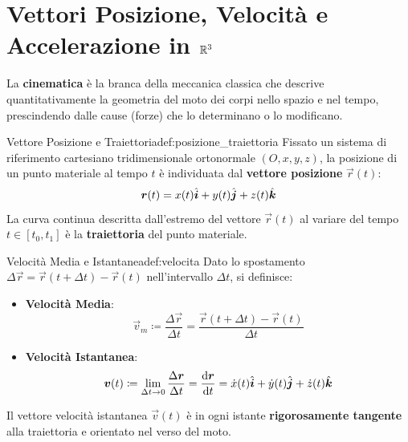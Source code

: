 \vspace{0.5em}

\section{Vettori Posizione, Velocità e Accelerazione in $\mathbb{R}^3$}
\label{sec:vettori_cinematici}

La \textbf{cinematica} è la branca della meccanica classica che descrive quantitativamente la geometria del moto dei corpi nello spazio e nel tempo, prescindendo dalle cause (forze) che lo determinano o lo modificano.

\begin{definizione}{Vettore Posizione e Traiettoria}{def:posizione_traiettoria}
Fissato un sistema di riferimento cartesiano tridimensionale ortonormale $(O, x, y, z)$, la posizione di un punto materiale al tempo $t$ è individuata dal \textbf{vettore posizione} $\vec{r}(t)$:
\begin{equation}
    \bm{r}(t) = x(t)\hat{\bm{i}} + y(t)\hat{\bm{j}} + z(t)\hat{\bm{k}}
    \label{eq:vettore_posizione}
\end{equation}
La curva continua descritta dall'estremo del vettore $\vec{r}(t)$ al variare del tempo $t \in [t_0, t_1]$ è la \textbf{traiettoria} del punto materiale.
\end{definizione}

\begin{definizione}{Velocità Media e Istantanea}{def:velocita}
Dato lo spostamento $\Delta\vec{r} = \vec{r}(t+\Delta t) - \vec{r}(t)$ nell'intervallo $\Delta t$, si definisce:
\begin{itemize}
    \item \textbf{Velocità Media}:
    \begin{equation}
        \vec{v}_m \coloneqq \frac{\Delta\vec{r}}{\Delta t} = \frac{\vec{r}(t+\Delta t) - \vec{r}(t)}{\Delta t}
    \end{equation}
    \item \textbf{Velocità Istantanea}:
    \begin{equation}
        \bm{v}(t) \coloneqq \lim_{\Delta t \to 0} \frac{\Delta\bm{r}}{\Delta t} = \frac{\mathrm{d} \bm{r}}{\mathrm{d} t} = \dot{x}(t)\hat{\bm{i}} + \dot{y}(t)\hat{\bm{j}} + \dot{z}(t)\hat{\bm{k}}
        \label{eq:velocita_istantanea}
    \end{equation}
\end{itemize}
Il vettore velocità istantanea $\vec{v}(t)$ è in ogni istante \textbf{rigorosamente tangente} alla traiettoria e orientato nel verso del moto.
\end{definizione}

